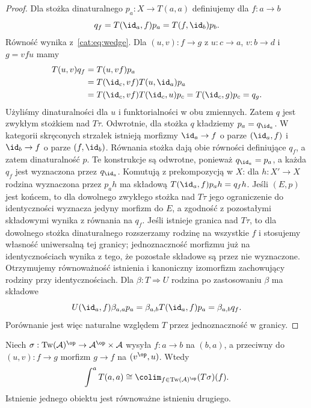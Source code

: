 \begin{proof}
Dla stożka dinaturalnego $p_a:X\to T(a,a)$ definiujemy dla $f:a\to b$
\[
 q_f=T(\id_a,f)p_a=T(f,\id_b)p_b.
\]
Równość wynika z~\eqref{cat:eq:wedge}. Dla $(u,v):f\to g$ z $u:c\to a$, $v:b\to d$ i $g=vfu$ mamy
\begin{align*}
 T(u,v)q_f
 &=T(u,vf)p_a\\
 &=T(\id_c,vf)T(u,\id_a)p_a\\
 &=T(\id_c,vf)T(\id_c,u)p_c
 =T(\id_c,g)p_c=q_g .
\end{align*}
Użyliśmy dinaturalności dla $u$ i funktorialności w obu zmiennych. Zatem $q$ jest zwykłym stożkiem nad $T\tau$. Odwrotnie, dla stożka $q$ kładziemy $p_a=q_{\id_a}$. W kategorii skręconych strzałek istnieją morfizmy $\id_a\to f$ o parze $(\id_a,f)$ i $\id_b\to f$ o parze $(f,\id_b)$. Równania stożka dają obie równości definiujące $q_f$, a zatem dinaturalność $p$. Te konstrukcje są odwrotne, ponieważ $q_{\id_a}=p_a$, a każda $q_f$ jest wyznaczona przez $q_{\id_a}$. Komutują z prekompozycją w $X$: dla $h:X'\to X$ rodzina wyznaczona przez $p_a h$ ma składową $T(\id_a,f)p_a h=q_f h$. Jeśli $(E,p)$ jest końcem, to dla dowolnego zwykłego stożka nad $T\tau$ jego ograniczenie do identyczności wyznacza jedyny morfizm do $E$, a zgodność z pozostałymi składowymi wynika z równania na $q_f$. Jeśli istnieje granica nad $T\tau$, to dla dowolnego stożka dinaturalnego rozszerzamy rodzinę na wszystkie $f$ i stosujemy własność uniwersalną tej granicy; jednoznaczność morfizmu już na identycznościach wynika z tego, że pozostałe składowe są przez nie wyznaczone. Otrzymujemy równoważność istnienia i kanoniczny izomorfizm zachowujący rodziny przy identycznościach. Dla $\beta:T\Rightarrow U$ rodzina po zastosowaniu $\beta$ ma składowe
\[
 U(\id_a,f)\beta_{a,a}p_a
 =\beta_{a,b}T(\id_a,f)p_a
 =\beta_{a,b}q_f.
\]
Porównanie jest więc naturalne względem $T$ przez jednoznaczność w granicy.
\end{proof}
\begin{twierdzenie}\label{cat:thm:coend-twisted}
Niech $\sigma:\operatorname{Tw}(\mathcal A)^{\op}\to\mathcal A^{\op}\times\mathcal A$ wysyła $f:a\to b$ na $(b,a)$, a przeciwny do $(u,v):f\to g$ morfizm $g\to f$ na $(v^{\op},u)$. Wtedy
\[
 \int^a T(a,a)\cong
 \colim_{f\in\operatorname{Tw}(\mathcal A)^{\op}} (T\sigma)(f).
\]
Istnienie jednego obiektu jest równoważne istnieniu drugiego.
\end{twierdzenie}
